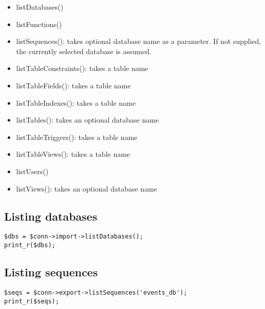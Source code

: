 \documentclass[11pt,a4paper]{report}
\begin{document}
\begin{itemize}
\item{listDatabases()}
\end{itemize}
\begin{itemize}
\item{listFunctions()}
\end{itemize}
\begin{itemize}
\item{listSequences(): takes optional database name as a parameter. If not supplied, the currently selected database is assumed.}
\end{itemize}
\begin{itemize}
\item{listTableConstraints(): takes a table name}
\end{itemize}
\begin{itemize}
\item{listTableFields(): takes a table name}
\end{itemize}
\begin{itemize}
\item{listTableIndexes(): takes a table name}
\end{itemize}
\begin{itemize}
\item{listTables(): takes an optional database name}
\end{itemize}
\begin{itemize}
\item{listTableTriggers(): takes a table name}
\end{itemize}
\begin{itemize}
\item{listTableViews(): takes a table name}
\end{itemize}
\begin{itemize}
\item{listUsers()}
\end{itemize}
\begin{itemize}
\item{listViews(): takes an optional database name}
\end{itemize}
\subsection{Listing databases}
\begin{verbatim}
$dbs = $conn->import->listDatabases();
print_r($dbs);
\end{verbatim}

\subsection{Listing sequences}
\begin{verbatim}
$seqs = $conn->export->listSequences('events_db');
print_r($seqs);
\end{verbatim}
\end{document}

